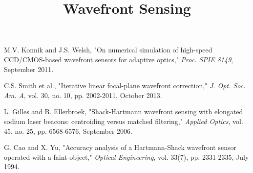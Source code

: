 \documentclass{article}
\title{Wavefront Sensing}
\begin{document}
\maketitle









\begin{thebibliography}{9}
M.V. Konnik and J.S. Welsh, "On numerical simulation of high-speed CCD/CMOS-based wavefront sensors for adaptive optics,"
\textit{Proc. SPIE 8149},
September 2011.

C.S. Smith et al., "Iterative linear focal-plane wavefront correction,"
\textit{J. Opt. Soc. Am. A}, vol. 30, no. 10, pp. 2002-2011, 
October 2013.

L. Gilles and B. Ellerbroek, "Shack-Hartmann wavefront sensing with elongated sodium laser beacons: centroiding versus matched filtering,"
\textit{Applied Optics}, vol. 45, no. 25, pp. 6568-6576, 
September 2006.

G. Cao and X. Yu, "Accuracy analysis of a Hartmann-Shack wavefront sensor operated with a faint object," 
\textit{Optical Engineering}, vol. 33(7), pp. 2331-2335, 
July 1994. 


\end{thebibliography}
\end{document}
